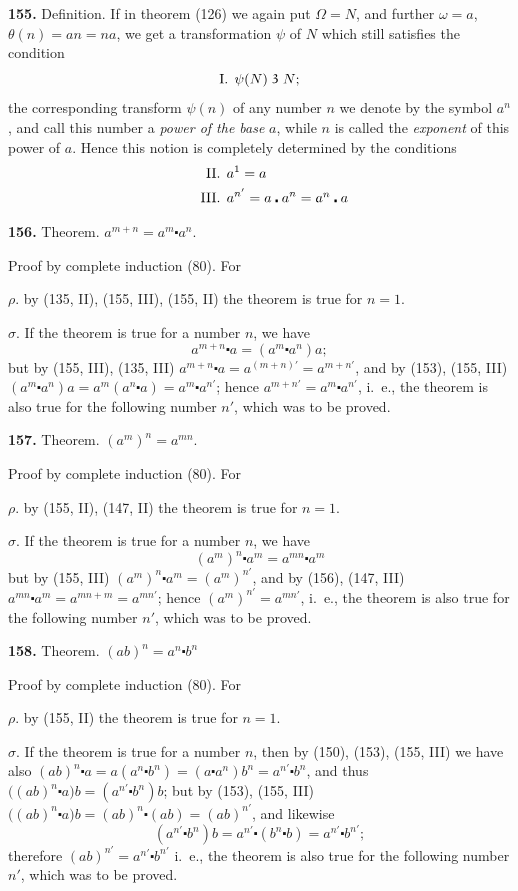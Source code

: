 \documentclass[oneside]{book}
\newcommand\partof{\mathrel{\raisebox{0.45ex}{$\mathfrak{3}$}}}   %
\newcommand\mypara{\medskip\textbf}
\begin{document}
\mypara{155.} Definition. If in theorem (126) we again put
$\Omega = N$, and further $\omega=a$, $\theta(n)=an=na$, we get a
transformation $\psi$ of $N$ which still satisfies the condition
\[
\text{I\@. }\psi(N) \partof N;
\]
the corresponding transform $\psi(n)$ of any number $n$
we denote by the symbol $a^n$, and call this number a
\textit{power of the base} $a$, while $n$ is called the \textit{exponent} of
this power of $a$. Hence this notion is completely determined
by the conditions
\begin{align*}
\text{II\@. }& a^1=a\\
\text{III\@. }& a^{n'}=a\centerdot a^n =\rlap{$a^n\centerdot a$}.
\end{align*}

\mypara{156.} Theorem. $a^{m+n}=a^m\centerdot a^n$.

Proof by complete induction (80). For

$\rho$. by (135, II), (155, III), (155, II) the theorem
is true for $n = 1$.

$\sigma$. If the theorem is true for a number $n$, we have
\[
a^{m+n}\centerdot a=(a^m\centerdot a^n)a;
\]
but by (155, III), (135, III)
$a^{m+n}\centerdot a=a^{(m+n)'}=a^{m+n'}$,
and by (153), (155, III)
$(a^m\centerdot a^n)a=a^m(a^n\centerdot a)=a^m\centerdot a^{n'}$;
hence $a^{m+n'}=a^m\centerdot a^{n'}$, i.~e., the theorem is also true for
the following number $n'$, which was to be proved.

\mypara{157.} Theorem. $(a^m)^n=a^{mn}$.


Proof by complete induction (80). For

$\rho$. by (155, II), (147, II) the theorem is true for
$n = 1$.

$\sigma$. If the theorem is true for a number $n$, we have
\[
(a^m)^n\centerdot a^m=a^{mn}\centerdot a^m
\]
but by (155, III) $(a^m)^n\centerdot a^m=(a^m)^{n'}$, and by (156), (147,
III) $a^{mn}\centerdot a^m=a^{mn+m}=a^{mn'}$; hence $(a^m)^{n'}=a^{mn'}$, i.~e.,
the theorem is also true for the following number $n'$,
which was to be proved.

\mypara{158.} Theorem.  $(ab)^n=a^n\centerdot b^n$

Proof by complete induction (80). For

$\rho$. by (155, II) the theorem is true for $n = 1$.

$\sigma$. If the theorem is true for a number $n$, then by
(150), (153), (155, III) we have also $(ab)^n\centerdot a=
a(a^n\centerdot b^n)=(a\centerdot a^n)b^n=a^{n'}\centerdot b^n$, and thus
$\bigl( (ab)^n\centerdot a \bigr)b=
(a^{n'}\centerdot b^n)b$; but by (153), (155, III)
$\bigl( (ab)^n\centerdot a \bigr)b=
(ab)^n\centerdot (ab)=(ab)^{n'}$, and likewise
\[
 (a^{n'}\centerdot b^n)b = a^{n'}\centerdot (b^n\centerdot b)
= a^{n'}\centerdot b^{n'};
\]
therefore $(ab)^{n'}=a^{n'}\centerdot b^{n'}$ i.~e., the theorem is also true
for the following number $n'$, which was to be proved.
\end{document}
